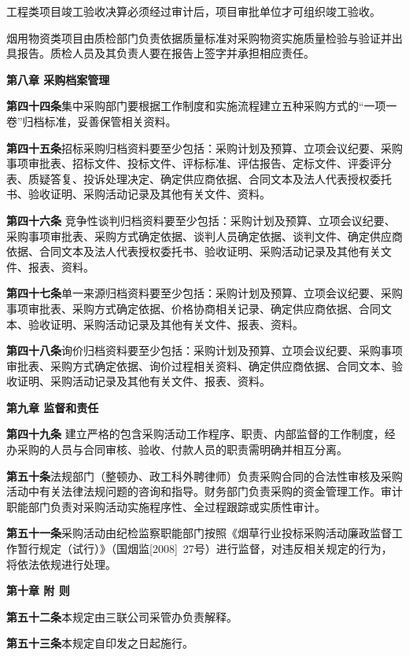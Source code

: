 工程类项目竣工验收决算必须经过审计后，项目审批单位才可组织竣工验收。

烟用物资类项目由质检部门负责依据质量标准对采购物资实施质量检验与验证并出具报告。质检人员及其负责人要在报告上签字并承担相应责任。

\begin{center}
\textbf{第八章 \quad  采购档案管理}
\end{center}

\textbf{第四十四条}\quad  集中采购部门要根据工作制度和实施流程建立五种采购方式的“一项一卷”归档标准，妥善保管相关资料。

\textbf{第四十五条}\quad  招标采购归档资料要至少包括：采购计划及预算、立项会议纪要、采购事项审批表、招标文件、投标文件、评标标准、评估报告、定标文件、评委评分表、质疑答复、投诉处理决定、确定供应商依据、合同文本及法人代表授权委托书、验收证明、采购活动记录及其他有关文件、资料。

\textbf{第四十六条 }\quad 竞争性谈判归档资料要至少包括：采购计划及预算、立项会议纪要、采购事项审批表、采购方式确定依据、谈判人员确定依据、谈判文件、确定供应商依据、合同文本及法人代表授权委托书、验收证明、采购活动记录及其他有关文件、报表、资料。

\textbf{第四十七条}\quad  单一来源归档资料要至少包括：采购计划及预算、立项会议纪要、采购事项审批表、采购方式确定依据、价格协商相关记录、确定供应商依据、合同文本、验收证明、采购活动记录及其他有关文件、报表、资料。

\textbf{第四十八条}\quad  询价归档资料要至少包括：采购计划及预算、立项会议纪要、采购事项审批表、采购方式确定依据、询价过程相关资料、确定供应商依据、合同文本、验收证明、采购活动记录及其他有关文件、报表、资料。

\begin{center}
\textbf{第九章 \quad  监督和责任}
\end{center}

\textbf{第四十九条} \quad 建立严格的包含采购活动工作程序、职责、内部监督的工作制度，经办采购的人员与合同审核、验收、付款人员的职责需明确并相互分离。

\textbf{第五十条}\quad  法规部门（整顿办、政工科外聘律师）负责采购合同的合法性审核及采购活动中有关法律法规问题的咨询和指导。财务部门负责采购的资金管理工作。审计职能部门负责对采购活动实施程序性、全过程跟踪或实质性审计。

\textbf{第五十一条}\quad  采购活动由纪检监察职能部门按照《烟草行业投标采购活动廉政监督工作暂行规定（试行）》（国烟监[2008]~27号）进行监督，对违反相关规定的行为，将依法依规进行处理。

\begin{center}
\textbf{第十章 \quad  附  则}
\end{center}

\textbf{第五十二条}\quad 本规定由三联公司采管办负责解释。

\textbf{第五十三条}\quad 本规定自印发之日起施行。

